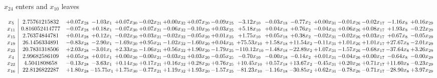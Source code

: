 \documentclass[9pt]{article}
\begin{document}
 $ x_{24} $ enters and $ x_{10} $ leaves 

 \[\begin{array}{c| c c@{\hskip 2pt} c@{\hskip 2pt} c@{\hskip 2pt} c@{\hskip 2pt} c@{\hskip 2pt} c@{\hskip 2pt} c@{\hskip 2pt} c@{\hskip 2pt} c@{\hskip 2pt} c@{\hskip 2pt} c@{\hskip 2pt} c@{\hskip 2pt} c@{\hskip 2pt} c@{\hskip 2pt} c@{\hskip 2pt} }
 x_{5}   &  2.75761215832 & +  0.07 x_{28} & -1.03 x_{1} & +  0.07 x_{30} & -0.02 x_{21} & +  0.00 x_{32} & +  0.07 x_{20} & -0.09 x_{25} & -3.12 x_{10} & -0.03 x_{18} & -0.77 x_{2} & +  0.00 x_{31} & -0.01 x_{26} & -0.02 x_{17} & -1.16 x_{8} & +  0.16 x_{29}\\
 x_{11}   &  0.816052414777 & -0.07 x_{28} & +  0.18 x_{1} & -0.07 x_{30} & +  0.07 x_{21} & -0.06 x_{32} & -0.10 x_{20} & +  0.03 x_{25} & +  5.18 x_{10} & +  0.04 x_{18} & +  0.76 x_{2} & -0.04 x_{31} & +  0.06 x_{26} & +  0.08 x_{17} & +  1.93 x_{8} & -0.22 x_{29}\\
 x_{15}   &  2.76374844781 & +  0.01 x_{28} & +  0.12 x_{1} & -0.02 x_{30} & +  0.03 x_{21} & -0.02 x_{32} & -0.05 x_{20} & +  0.01 x_{25} & +  1.75 x_{10} & +  0.05 x_{18} & +  0.38 x_{2} & -0.02 x_{31} & -0.02 x_{26} & +  0.03 x_{17} & +  0.67 x_{8} & -0.05 x_{29}\\
 x_{19}   &  26.1456334891 & -0.83 x_{28} & -2.90 x_{1} & -1.69 x_{30} & +  0.95 x_{21} & -1.02 x_{32} & -1.60 x_{20} & +  0.04 x_{25} & + 75.53 x_{10} & +  1.58 x_{18} & + 11.54 x_{2} & -0.11 x_{31} & +  1.01 x_{26} & +  1.01 x_{17} & + 27.67 x_{8} & -2.01 x_{29}\\
 x_{23}   &  20.7831318506 & +  2.03 x_{28} & -3.01 x_{1} & +  2.33 x_{30} & -1.06 x_{21} & +  0.56 x_{32} & +  1.90 x_{20} & -1.79 x_{25} & -110.12 x_{10} & -1.48 x_{18} & -22.89 x_{2} & +  1.07 x_{31} & -1.57 x_{26} & -0.68 x_{17} & -37.64 x_{8} & +  3.26 x_{29}\\
 x_{4}   &  2.99682586109 & +  0.05 x_{28} & +  0.01 x_{1} & +  0.00 x_{30} & -0.00 x_{21} & -0.03 x_{32} & +  0.03 x_{20} & -0.05 x_{25} & -0.70 x_{10} & -0.00 x_{18} & -0.14 x_{2} & +  0.01 x_{31} & -0.04 x_{26} & +  0.00 x_{17} & -0.64 x_{8} & -0.00 x_{29}\\
 x_{22}   &  4.5041808658 & -0.13 x_{28} & -3.63 x_{1} & +  0.14 x_{30} & +  0.17 x_{21} & +  0.16 x_{32} & +  0.28 x_{20} & +  0.76 x_{25} & + 10.45 x_{10} & +  0.57 x_{18} & + 13.67 x_{2} & -0.45 x_{31} & +  0.20 x_{26} & +  0.71 x_{17} & + 11.60 x_{8} & -0.23 x_{29}\\
 x_{16}   &  22.8126822287 & +  1.80 x_{28} & -15.75 x_{1} & +  1.75 x_{30} & -0.77 x_{21} & +  1.19 x_{32} & +  1.93 x_{20} & -1.57 x_{25} & -81.23 x_{10} & -1.16 x_{18} & -30.85 x_{2} & +  0.62 x_{31} & -0.78 x_{26} & -0.71 x_{17} & -28.90 x_{8} & +  3.97 x_{29}\\

\end{array}\]
\end{document}
